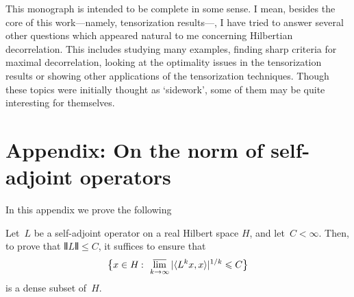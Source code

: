 This monograph is intended to be complete in some sense.
I mean, besides the core of this work—namely, tensorization results—,
I have tried to answer several other questions which appeared natural to me
concerning Hilbertian decorrelation.
This includes studying many examples,
finding sharp criteria for maximal decorrelation,
looking at the optimality issues in the tensorization results
or showing other applications of the tensorization techniques.
Though these topics were initially thought as `sidework',
some of them may be quite interesting for themselves.



\section{Appendix: On the norm of self-adjoint operators}%
\label{parOnTheNormOfSelfAdjointOperators}

In this appendix we prove the following
%
\begin{Lem}\label{l3253}
Let~$L$ be a self-adjoint operator on a real Hilbert space $H$, and let~$C<\infty$.
Then, to prove that $\VERT L \VERT \leq C$, it suffices to ensure that
\[\big\{ x\in H \colon \limsup_{k\longto\infty} |\langle L^k x, x \rangle|^{1/k} \leq C \big\}\]
is a dense subset of~$H$.
\end{Lem}

